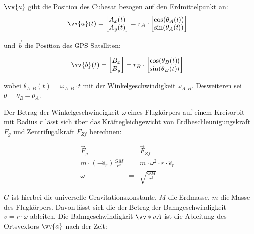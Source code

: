 
$\vv{a}$ gibt die Position des Cubesat bezogen auf den Erdmittelpunkt an:
\begin{equation}
    \vv{a}(t)=\begin{bmatrix} 
        A_x(t)\\ 
        A_y(t) 
    \end{bmatrix} = 
    r_A \cdot \begin{bmatrix} 
        \cos(\theta_A(t))\\ 
        \sin(\theta_A(t)) 
    \end{bmatrix}
\end{equation}

und $\vec{b}$ die Position des GPS Satelliten:

\begin{equation}
    \vv{b}(t)=\begin{bmatrix} 
        B_x\\ 
        B_y 
    \end{bmatrix} = 
    r_B \cdot \begin{bmatrix} 
        \cos(\theta_B(t))\\ 
        \sin(\theta_B(t)) 
    \end{bmatrix}
\end{equation}

wobei $\theta_{A,B}(t)=\omega_{A,B} \cdot t$ mit der Winkelgeschwindigkeit $\omega_{A,B}$. Desweiteren sei $\theta = \theta_B-\theta_A$.

Der Betrag der Winkelgeschwindigkeit $\omega$ eines Flugkörpers auf einem Kreisorbit mit Radius $r$ lässt sich über das Kräftegleichgewicht von Erdbeschleunigungskraft $F_g$ und Zentrifugalkraft $F_{Zf}$ berechnen:

\begin{eqnarray}
    \vec{F}_g &=& \vec{F}_{Zf} \\
    m \cdot (-\hat{e}_r) \frac{G M}{r^2} &=& m \cdot \omega^2 \cdot r \cdot \hat{e}_r\\
    \omega &=& \sqrt{\frac{G M}{r^3}}
\end{eqnarray}

$G$ ist hierbei die universelle Gravitationskonstante, $M$ die Erdmasse, $m$ die Masse des Flugkörpers. Davon lässt sich die der Betrag der Bahngeschwindigkeit $v=r \cdot \omega$ ableiten. Die Bahngeschwindigkeit $\vv*{v}{A}$ ist die Ableitung des Ortsvektors $\vv{a}$ nach der Zeit:

